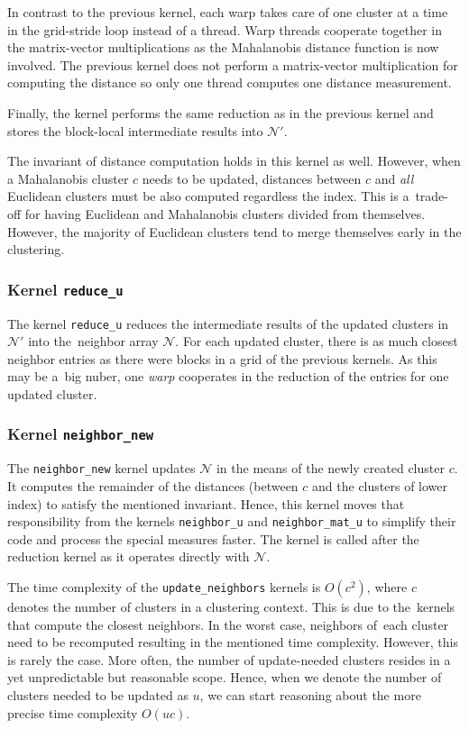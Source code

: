 In contrast to the previous kernel, each warp takes care of one cluster at a time in the grid-stride loop instead of a thread. Warp threads cooperate together in the matrix-vector multiplications as the Mahalanobis distance function is now involved. The previous kernel does not perform a matrix-vector multiplication for computing the distance so only one thread computes one distance measurement.

Finally, the kernel performs the same reduction as in the previous kernel and stores the block-local intermediate results into $\mathcal{N}'$.

\begin{rem}
	The invariant of distance computation holds in this kernel as well. However, when a Mahalanobis cluster $c$ needs to be updated, distances between $c$ and \emph{all} Euclidean clusters must be also computed regardless the index. This is a~trade-off for having Euclidean and Mahalanobis clusters divided from themselves. However, the majority of Euclidean clusters tend to merge themselves early in the clustering.
\end{rem}

\subsubsection{Kernel \texttt{reduce\_u}} The kernel \texttt{reduce\_u} reduces the intermediate results of the updated clusters in~$\mathcal{N}'$ into the~neighbor array $\mathcal{N}$. For each updated cluster, there is as much closest neighbor entries as there were blocks in a grid of the previous kernels. As this may be a~big nuber, one \emph{warp} cooperates in the reduction of the entries for one updated cluster.

\subsubsection{Kernel \texttt{neighbor\_new}} The \texttt{neighbor\_new} kernel updates $\mathcal{N}$ in the means of the newly created cluster $c$. It computes the remainder of the distances (between $c$ and the clusters of lower index) to satisfy the mentioned invariant. Hence, this kernel moves that responsibility from the kernels \texttt{neighbor\_u} and \texttt{neighbor\_mat\_u} to simplify their code and process the special measures faster. The kernel is called after the reduction kernel as it operates directly with $\mathcal{N}$. 

\begin{rem}
	The time complexity of the \texttt{update\_neighbors} kernels is $O(c^2)$, where $c$ denotes the number of clusters in a clustering context. This is due to the~kernels that compute the closest neighbors. In the worst case, neighbors of~each cluster need to be recomputed resulting in the mentioned time complexity. However, this is rarely the case. More often, the number of update-needed clusters resides in a yet unpredictable but reasonable scope. Hence, when we denote the number of clusters needed to be updated as $u$, we can start reasoning about the more precise time complexity $O(uc)$.
\end{rem}
